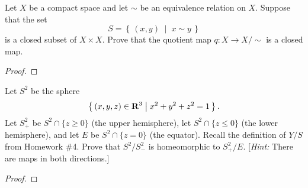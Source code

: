 \begin{problem}[A]
Let $X$ be a compact space and let $\sim$ be an equivalence
relation on $X$. Suppose that the set
\[
S=\left\{\,(x,y)\;\middle|\;x\sim y\,\right\}
\]
is a closed subset of $X\times X$. Prove that the quotient map
$q\colon X\to X/{\sim}$ is a closed map.
\end{problem}
\begin{proof}
\end{proof}
\newpage
\begin{problem}[B]
Let $S^2$ be the sphere
\[
\left\{\,(x,y,z)\in\mathbf{R}^3\;\middle|\;x^2+y^2+z^2=1\,\right\}.
\]
Let $S_+^2$ be $S^2\cap\{z\geq 0\}$ (the upper hemisphere), let
$S^2\cap\{z\leq 0\}$ (the lower hemisphere), and let $E$ be
$S^2\cap\{z=0\}$ (the equator). Recall the definition of $Y/S$
from Homework \#4. Prove that $S^2/S^2_-$ is homeomorphic to
$S_+^2/E$. [\emph{Hint:} There are maps in both directions.]
\end{problem}
\begin{proof}
\end{proof}

